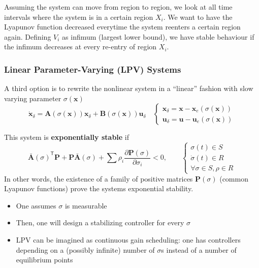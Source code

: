 \newpar{}

Assuming the system can move from region to region, we look at all time intervals where the system is in a certain region $X_i$. We want to have the Lyapunov function decreased everytime the system reenters a certain region again. Defining $V_i$ as infimum (largest lower bound), we have stable behaviour if the infimum decreases at every re-entry of region $X_i$.

\subsubsection{Linear Parameter-Varying (LPV) Systems}
A third option is to rewrite the nonlinear system in a ``linear'' fashion with slow varying parameter $\sigma(\mathbf{x})$
\noindent\begin{equation*}
    \dot{\mathbf{x}}_\delta = \mathbf{A} (\sigma(\mathbf{x}))\mathbf{x}_\delta + \mathbf{B}(\sigma(\mathbf{x}))\mathbf{u}_\delta\quad
    \begin{cases}
        \mathbf{x}_\delta = \mathbf{x}-\mathbf{x}_e(\sigma(\mathbf{x})) \\
        \mathbf{u}_\delta = \mathbf{u}-\mathbf{u}_e(\sigma(\mathbf{x}))
    \end{cases}
\end{equation*}

\newpar{}

This system is \textbf{exponentially stable} if
\noindent\begin{equation*}
    {\bar{\mathbf{A}}(\sigma)}^{\mathsf{T}} \mathbf{P} + \mathbf{P}\bar{\mathbf{A}}(\sigma) + \sum \rho_i \frac{\partial \mathbf{P}(\sigma)}{\partial \sigma_i} < 0,\qquad
    \begin{cases}
        \sigma(t)\in S       \\
        \dot{\sigma}(t)\in R \\
        \forall \sigma\in S, \rho\in R
    \end{cases}
\end{equation*}
In other words, the existence of a family of positive matrices $\mathbf{P}(\sigma)$ (common Lyapunov functions) prove the systems exponential stability.

\newpar{}

\begin{itemize}
    \item One assumes $\sigma$ is measurable
    \item Then, one will design a stabilizing controller for every $\sigma$
    \item LPV can be imagined as continuous gain scheduling: one has controllers depending on a (possibly infinite) number of $\sigma$s instead of a number of equilibrium points
\end{itemize}

